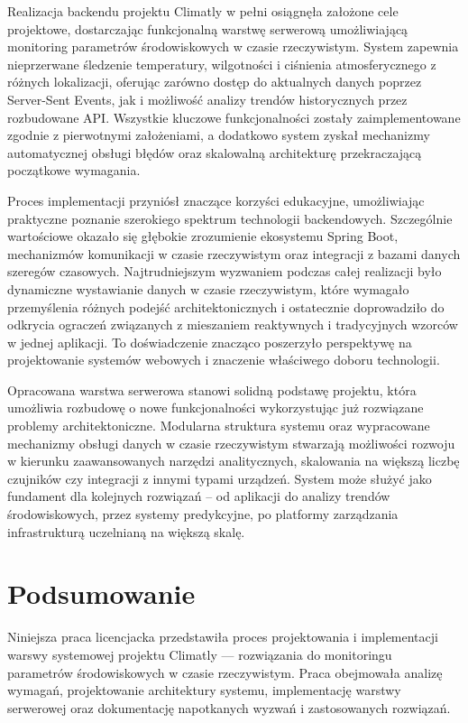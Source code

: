 \documentclass[a4paper,12pt,openany]{book}
\renewcommand{\chaptermark}[1]{\markboth{#1}{}}
\begin{document}
Realizacja backendu projektu Climatly w pełni osiągnęła założone cele projektowe, dostarczając funkcjonalną warstwę serwerową umożliwiającą monitoring parametrów środowiskowych w czasie rzeczywistym. System zapewnia nieprzerwane śledzenie temperatury, wilgotności i ciśnienia atmosferycznego z różnych lokalizacji, oferując zarówno dostęp do aktualnych danych poprzez Server-Sent Events, jak i możliwość analizy trendów historycznych przez rozbudowane API. Wszystkie kluczowe funkcjonalności zostały zaimplementowane zgodnie z pierwotnymi założeniami, a dodatkowo system zyskał mechanizmy automatycznej obsługi błędów oraz skalowalną architekturę przekraczającą początkowe wymagania.

Proces implementacji przyniósł znaczące korzyści edukacyjne, umożliwiając praktyczne poznanie szerokiego spektrum technologii backendowych. Szczególnie wartościowe okazało się głębokie zrozumienie ekosystemu Spring Boot, mechanizmów komunikacji w czasie rzeczywistym oraz integracji z bazami danych szeregów czasowych. Najtrudniejszym wyzwaniem podczas całej realizacji było dynamiczne wystawianie danych w czasie rzeczywistym, które wymagało przemyślenia różnych podejść architektonicznych i ostatecznie doprowadziło do odkrycia ograczeń związanych z mieszaniem reaktywnych i tradycyjnych wzorców w jednej aplikacji. To doświadczenie znacząco poszerzyło perspektywę na projektowanie systemów webowych i znaczenie właściwego doboru technologii.

Opracowana warstwa serwerowa stanowi solidną podstawę projektu, która umożliwia rozbudowę o nowe funkcjonalności wykorzystując już rozwiązane problemy architektoniczne. Modularna struktura systemu oraz wypracowane mechanizmy obsługi danych w czasie rzeczywistym stwarzają możliwości rozwoju w kierunku zaawansowanych narzędzi analitycznych, skalowania na większą liczbę czujników czy integracji z innymi typami urządzeń. System może służyć jako fundament dla kolejnych rozwiązań -- od aplikacji do analizy trendów środowiskowych, przez systemy predykcyjne, po platformy zarządzania infrastrukturą uczelnianą na większą skalę.
\chapter*{Podsumowanie}
\chaptermark{Podsumowanie}

Niniejsza praca licencjacka przedstawiła proces projektowania i implementacji warswy systemowej projektu Climatly --- rozwiązania do monitoringu parametrów środowiskowych w czasie rzeczywistym. Praca obejmowała analizę wymagań, projektowanie architektury systemu, implementację warstwy serwerowej oraz dokumentację napotkanych wyzwań i zastosowanych rozwiązań.
\end{document}
